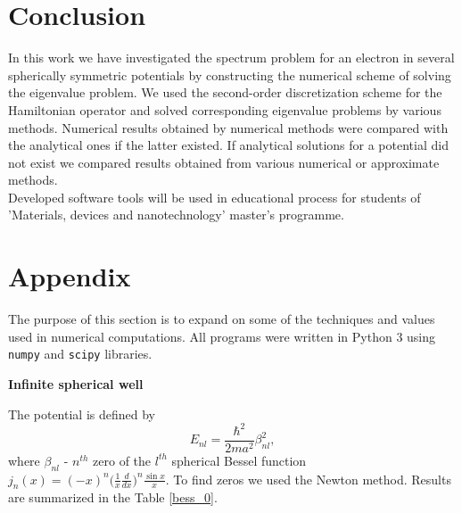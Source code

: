 \documentclass[a4paper, 12pt]{article}
\begin{document}
\section{Conclusion}
In this work we have investigated the spectrum problem for an electron in several spherically symmetric potentials by constructing the numerical scheme of solving the eigenvalue problem. We used the second-order discretization scheme for the Hamiltonian operator and solved corresponding eigenvalue problems by various methods. Numerical results obtained by numerical methods were compared with the analytical ones if the latter existed. If analytical solutions for a potential did not exist we compared results obtained from various numerical or approximate methods.\\
Developed software tools will be used in educational process for students of 'Materials, devices and nanotechnology' master's programme.



\section{Appendix}\label{appendix}
The purpose of this section is to expand on some of the techniques and values used in numerical computations. All programs were written in Python 3 using \texttt{numpy} and \texttt{scipy} libraries.
\begin{center}
		\large
		\textbf{ Infinite spherical well}		\\[0.5 cm]
\end{center}
The potential is defined by 
$$E_{nl} = \frac{\hbar^2}{2ma^2}\beta_{nl}^2,$$
where $\beta_{nl}$ -  $n^{th}$ zero of the $l^{th}$ spherical Bessel function $j_n(x) = (-x)^n\bigg(\displaystyle{\frac{1}{x} \frac{d}{dx}}\bigg)^n \frac{\sin{x}}{x}.$
To find zeros we used the Newton method. Results are summarized in the Table \ref{bess_0}.
\end{document}
